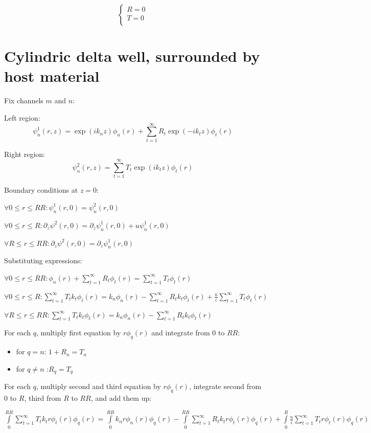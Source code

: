 \documentclass[12pt, a4paper]{article}
\begin{document}
$$\begin{cases}
R = 0\\
T = 0\\
\end{cases}$$

\section{Cylindric delta well, surrounded by host material}
Fix channels $m$ and $n$:

Left region:
$$\psi^1_n(r, z) = \exp(i k_n z) \phi_n(r) + \sum\limits_{t = 1}^\infty R_{t} \exp(-i k_t z) \phi_t(r)$$

Right region:
$$\psi^2_n(r, z) = \sum\limits_{t = 1}^\infty T_{t} \exp(i k_t z) \phi_t(r)$$


Boundary conditions at $z = 0$:

$\forall 0 \le r \le RR: \psi_n^1(r, 0) = \psi_n^2(r, 0)$

$\forall 0 \le r \le R: \partial_z \psi^2(r, 0) = \partial_z \psi_n^1(r, 0) + u \psi^1_n(r, 0)$

$\forall R \le r \le RR: \partial_z \psi^2(r, 0) = \partial_z \psi_n^1(r, 0)$

Substituting expressions:

$\forall 0 \le r \le RR: \phi_n(r) + \sum\limits_{t = 1}^\infty R_{t} \phi_t(r) = \sum\limits_{t = 1}^\infty T_{t} \phi_t(r)$

$\forall 0 \le r \le R: \sum\limits_{t = 1}^\infty T_{t} k_t \phi_t(r) = k_n \phi_n(r) - \sum\limits_{t = 1}^\infty R_{t} k_t \phi_t(r) +  \frac{u}{i} \sum\limits_{t = 1}^\infty T_{t} \phi_t(r)$

$\forall R \le r \le RR: \sum\limits_{t = 1}^\infty T_{t} k_t \phi_t(r) = k_n \phi_n(r) - \sum\limits_{t = 1}^\infty R_{t} k_t \phi_t(r)$

For each $q$, multiply first equation by $r \phi_q(r)$ and integrate from $0$ to $RR$:

\begin{itemize}
\item for $q = n$: $1 + R_{n} = T_{n}$
\item for $q \ne n$ :$R_{q} = T_{q}$
\end{itemize}

For each $q$, multiply second and third equation by $r \phi_q(r)$, integrate second from $0$ to $R$, third from $R$ to $RR$, and add them up:

$\int\limits_0^{RR} \sum\limits_{t = 1}^\infty T_{t} k_t r \phi_t(r) \phi_q(r) = \int\limits_0^{RR} k_n r \phi_n(r) \phi_q(r) - \int\limits_0^{RR} \sum\limits_{t = 1}^\infty R_{t} k_t r \phi_t(r) \phi_q(r) + \int\limits_0^R \frac{u}{i} \sum\limits_{t =1}^\infty T_{t} r \phi_t(r) \phi_q(r)$
\end{document}
